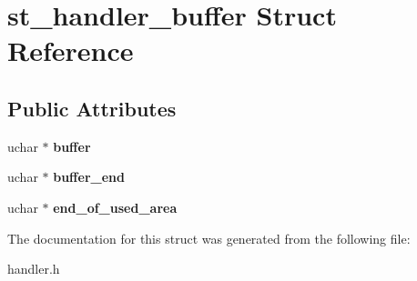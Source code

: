 \hypertarget{structst__handler__buffer}{}\section{st\+\_\+handler\+\_\+buffer Struct Reference}
\label{structst__handler__buffer}
\subsection*{Public Attributes}
\begin{DoxyCompactItemize}
\item 
\mbox{\label{structst__handler__buffer_a454982609903ff4ed2c36debe6d5d80b}} 
uchar $\ast$ {\bfseries buffer}
\item 
\mbox{\label{structst__handler__buffer_a387343d883fda1bae552291141bcb987}} 
uchar $\ast$ {\bfseries buffer\+\_\+end}
\item 
\mbox{\label{structst__handler__buffer_a06f7059513a3bf73b19cd397d41de69d}} 
uchar $\ast$ {\bfseries end\+\_\+of\+\_\+used\+\_\+area}
\end{DoxyCompactItemize}


The documentation for this struct was generated from the following file\+:\begin{DoxyCompactItemize}
\item 
handler.\+h\end{DoxyCompactItemize}
